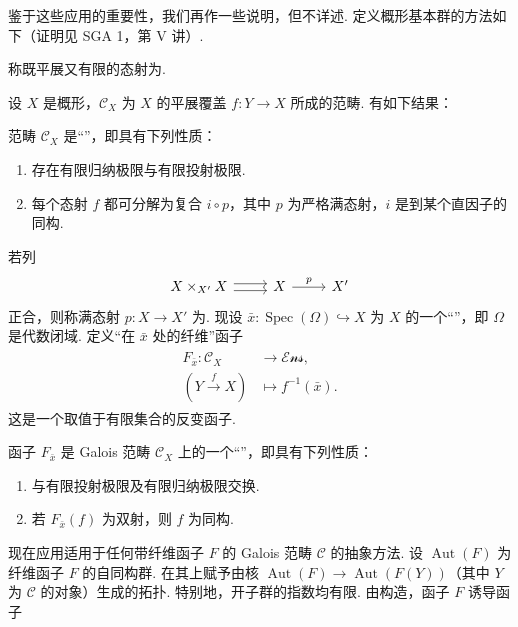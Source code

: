 鉴于这些应用的重要性，我们再作一些说明，但不详述. 定义概形基本群的方法如下（证明见 SGA 1，第 V 讲）.
\begin{definition}\label{item:ag-3-3-16}
称既平展又有限的态射为.
\end{definition}
设 $X$ 是概形，$\mathcal C_X$ 为 $X$ 的平展覆盖 $f:Y\longrightarrow X$ 所成的范畴. 有如下结果：
\begin{theorem}\label{item:ag-3-3-17}
范畴 $\mathcal C_X$ 是``''，即具有下列性质：
\begin{enumerate}[label=\roman*)]
\item 存在有限归纳极限与有限投射极限.
\item 每个态射 $f$ 都可分解为复合 $i\circ p$，其中 $p$ 为严格满态射，$i$ 是到某个直因子的同构.
\end{enumerate}
\end{theorem}
若列
\begin{align*}
\begin{tikzcd}[ampersand replacement=\&]
X\times_{X'}X\arrow[r,shift left]\arrow[r,shift right] \& X\arrow[r,"p"] \& X'
\end{tikzcd}
\end{align*}
正合，则称满态射 $p:X\longrightarrow X'$ 为.
现设 $\bar x:\operatorname{Spec}(\Omega)\hookrightarrow X$ 为 $X$ 的一个``''，即 $\Omega$ 是代数闭域. 定义``在 $\bar x$ 处的纤维''函子
\begin{align*}
\begin{aligned}
F_{\bar x}:\mathcal C_X&\longrightarrow\mathcal{Ens},\\
(Y\xrightarrow fX)&\longmapsto f^{-1}(\bar x).
\end{aligned}
\end{align*}
这是一个取值于有限集合的反变函子.
\begin{theorem}\label{item:ag-3-3-18}
函子 $F_{\bar x}$ 是 Galois 范畴 $\mathcal C_X$ 上的一个``''，即具有下列性质：
\begin{enumerate}[label=\roman*)]
\item 与有限投射极限及有限归纳极限交换.
\item 若 $F_{\bar x}(f)$ 为双射，则 $f$ 为同构.
\end{enumerate}
\end{theorem}
现在应用适用于任何带纤维函子 $F$ 的 Galois 范畴 $\mathcal C$ 的抽象方法. 设 $\operatorname{Aut}(F)$ 为纤维函子 $F$ 的自同构群. 在其上赋予由核 $\operatorname{Aut}(F)\longrightarrow\operatorname{Aut}(F(Y))$（其中 $Y$ 为 $\mathcal C$ 的对象）生成的拓扑. 特别地，开子群的指数均有限. 由构造，函子 $F$ 诱导函子
